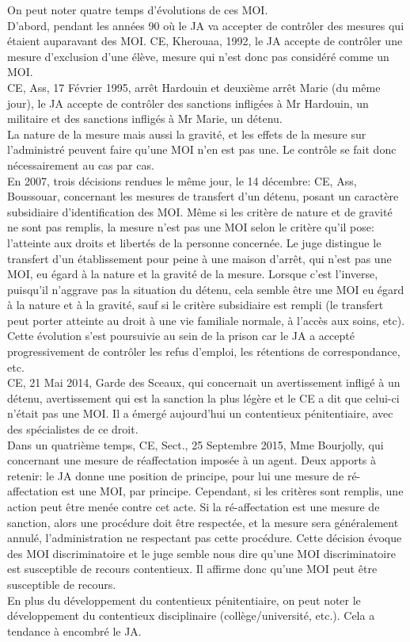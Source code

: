 \documentclass[10pt, a4paper, openany]{book}
\begin{document}
On peut noter quatre temps d'évolutions de ces MOI. \\
D'abord, pendant les années 90 où le JA va accepter de contrôler des mesures qui étaient auparavant des MOI. CE, Kherouaa, 1992, le JA accepte de contrôler une mesure d'exclusion d'une élève, mesure qui n'est donc pas considéré comme un MOI. \\
CE, Ass, 17 Février 1995, arrêt Hardouin et deuxième arrêt Marie (du même jour), le JA accepte de contrôler des sanctions infligées à Mr Hardouin, un militaire et des sanctions infligés à Mr Marie, un détenu. \\
La nature de la mesure mais aussi la gravité, et les effets de la mesure sur l'administré peuvent faire qu'une MOI n'en est pas une. Le contrôle se fait donc nécessairement au cas par cas. \\
En 2007, trois décisions rendues le même jour, le 14 décembre: CE, Ass, Boussouar, concernant les mesures de transfert d'un détenu, posant un caractère subsidiaire d'identification des MOI. Même si les critère de nature et de gravité ne sont pas remplis, la mesure n'est pas une MOI selon le critère qu'il pose: l'atteinte aux droits et libertés de la personne concernée. Le juge distingue le transfert d'un établissement pour peine à une maison d'arrêt, qui n'est pas une MOI, eu égard à la nature et la gravité de la mesure. Lorsque c'est l'inverse, puisqu'il n'aggrave pas la situation du détenu, cela semble être une MOI eu égard à la nature et à la gravité, sauf si le critère subsidiaire est rempli (le transfert peut porter atteinte au droit à une vie familiale normale, à l'accès aux soins, etc). \\
Cette évolution s'est poursuivie au sein de la prison car le JA a accepté progressivement de contrôler les refus d'emploi, les rétentions de correspondance, etc. \\
CE, 21 Mai 2014, Garde des Sceaux, qui concernait un avertissement infligé à un détenu, avertissement qui est la sanction la plus légère et le CE a dit que celui-ci n'était pas une MOI. Il a émergé aujourd'hui un contentieux pénitentiaire, avec des spécialistes de ce droit. \\
Dans un quatrième temps, CE, Sect., 25 Septembre 2015, Mme Bourjolly, qui concernant une mesure de réaffectation imposée à un agent. Deux apports à retenir: le JA donne une position de principe, pour lui une mesure de ré-affectation est une MOI, par principe. Cependant, si les critères sont remplis, une action peut être menée contre cet acte. Si la ré-affectation est une mesure de sanction, alors une procédure doit être respectée, et la mesure sera généralement annulé, l'administration ne respectant pas cette procédure. Cette décision évoque des MOI discriminatoire et le juge semble nous dire qu'une MOI discriminatoire est susceptible de recours contentieux. Il affirme donc qu'une MOI peut être susceptible de recours. \\
En plus du développement du contentieux pénitentiaire, on peut noter le développement du contentieux disciplinaire (collège/université, etc.). Cela a tendance à encombré le JA. 
\end{document}
